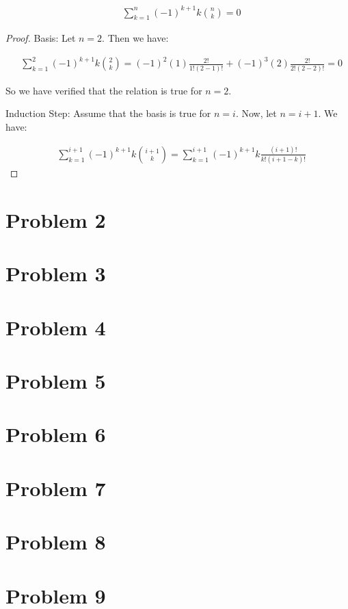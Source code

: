\documentclass[11pt]{article}
\begin{document}
\begin{enumerate}[(a)]
\begin{align*}
  & \sum_{k=1}^n (-1)^{k+1} k {n \choose k} = 0
\end{align*}

\begin{proof}
Basis: Let $n=2$.  Then we have:

\begin{align*}
  & \sum_{k=1}^2 (-1)^{k+1} k {2 \choose k} = (-1)^2 (1) \frac{2!}{1!(2-1)!} + (-1)^3 (2) \frac{2!}{2!(2-2)!} = 0
\end{align*}

So we have verified that the relation is true for $n=2$.

Induction Step: Assume that the basis is true for $n=i$.  Now, let $n=i+1$.  We have:

\begin{align*}
  & \sum_{k=1}^{i+1} (-1)^{k+1} k {i+1 \choose k} = \sum_{k=1}^{i+1} (-1)^{k+1} k \frac{(i+1)!}{k!(i+1-k)!}
\end{align*}

\end{proof}

\end{enumerate}

\section*{Problem 2}


\section*{Problem 3}


\section*{Problem 4}


\section*{Problem 5}


\section*{Problem 6}


\section*{Problem 7}


\section*{Problem 8}


\section*{Problem 9}
\end{document}
